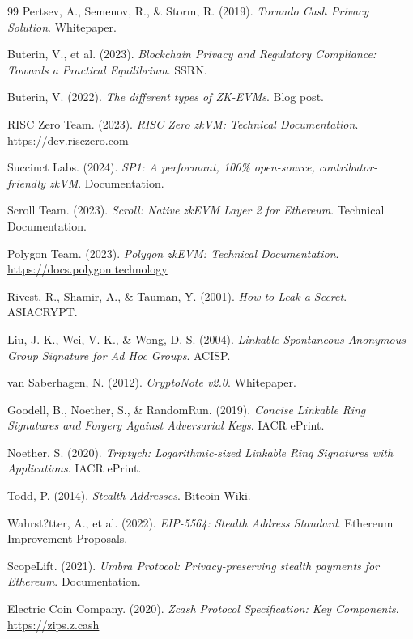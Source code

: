 \documentclass[11pt,a4paper,twoside]{book}
\begin{document}
\begin{thebibliography}{99}
 Pertsev, A., Semenov, R., \& Storm, R. (2019). \textit{Tornado Cash Privacy Solution}. Whitepaper.

 Buterin, V., et al. (2023). \textit{Blockchain Privacy and Regulatory Compliance: Towards a Practical Equilibrium}. SSRN.

 Buterin, V. (2022). \textit{The different types of ZK-EVMs}. Blog post.

 RISC Zero Team. (2023). \textit{RISC Zero zkVM: Technical Documentation}. \url{https://dev.risczero.com}

 Succinct Labs. (2024). \textit{SP1: A performant, 100\% open-source, contributor-friendly zkVM}. Documentation.

 Scroll Team. (2023). \textit{Scroll: Native zkEVM Layer 2 for Ethereum}. Technical Documentation.

 Polygon Team. (2023). \textit{Polygon zkEVM: Technical Documentation}. \url{https://docs.polygon.technology}


 Rivest, R., Shamir, A., \& Tauman, Y. (2001). \textit{How to Leak a Secret}. ASIACRYPT.

 Liu, J. K., Wei, V. K., \& Wong, D. S. (2004). \textit{Linkable Spontaneous Anonymous Group Signature for Ad Hoc Groups}. ACISP.

 van Saberhagen, N. (2012). \textit{CryptoNote v2.0}. Whitepaper.

 Goodell, B., Noether, S., \& RandomRun. (2019). \textit{Concise Linkable Ring Signatures and Forgery Against Adversarial Keys}. IACR ePrint.

 Noether, S. (2020). \textit{Triptych: Logarithmic-sized Linkable Ring Signatures with Applications}. IACR ePrint.

 Todd, P. (2014). \textit{Stealth Addresses}. Bitcoin Wiki.

 Wahrst?tter, A., et al. (2022). \textit{EIP-5564: Stealth Address Standard}. Ethereum Improvement Proposals.

 ScopeLift. (2021). \textit{Umbra Protocol: Privacy-preserving stealth payments for Ethereum}. Documentation.

 Electric Coin Company. (2020). \textit{Zcash Protocol Specification: Key Components}. \url{https://zips.z.cash}


\end{thebibliography}
\end{document}

